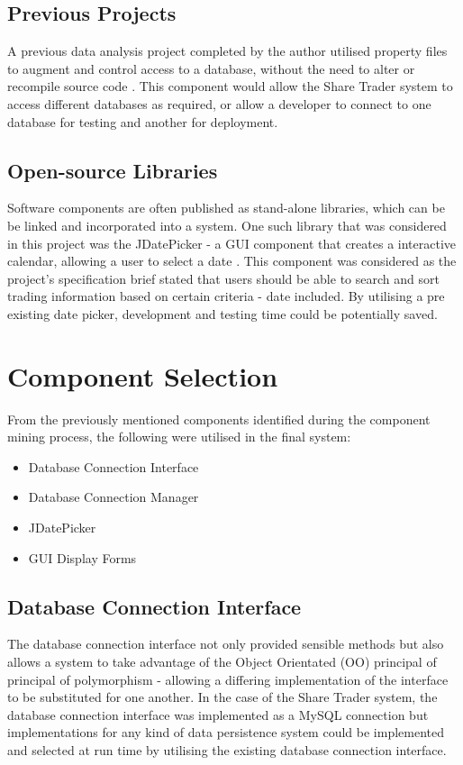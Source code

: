 \documentclass[12pt, a4paper,titlepage]{article}
\begin{document}
\subsection{Previous Projects}
A previous data analysis project completed by the author utilised property
files to augment and control access to a database, without the need to alter
or recompile source code \cite{Dixon2017}.  
This component would allow the Share Trader system
to access different databases as required, or allow a developer to connect to
one database for testing and another for deployment.

\subsection{Open-source Libraries}
Software components are often published as stand-alone libraries, which can be
be linked and incorporated into a system. 
One such library that was considered in this project was the JDatePicker - a
GUI component that creates a interactive calendar, allowing a user to select a
date \cite{Jdate}. 
This component was considered as the project's specification brief stated that
users should be able to search and sort trading information based on certain
criteria - date included. 
By utilising a pre existing date picker, development and testing time could be
potentially saved.


\section{Component Selection}
From the previously mentioned components identified  during the
component mining process, the following were utilised in the final system:

\begin{itemize}
\item Database Connection Interface
\item Database Connection Manager
\item JDatePicker
\item GUI Display Forms
\end{itemize}

\subsection{Database Connection Interface}
The database connection interface not only provided sensible methods but also
allows a system to take advantage of the Object Orientated (OO) principal of
principal of polymorphism - allowing a differing implementation of the
interface to be substituted for one another. 
In the case of the Share Trader system, the database connection interface was
implemented as a MySQL connection but implementations for any kind of data
persistence system could be implemented and selected at run time by
utilising the existing database connection interface.
\end{document}
